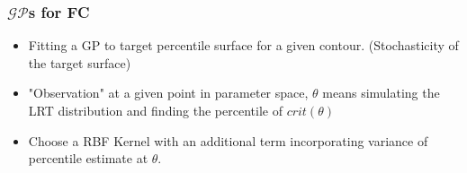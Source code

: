 \documentclass[9pt, aspectratio=169]{beamer}
\begin{document}
\begin{frame}
  \frametitle{$\mathcal{GP}$s for FC}
  \begin{itemize}
    \item Fitting a GP to target percentile surface for a given contour. (Stochasticity of the target surface) 
    \item "Observation" at a given point in parameter space, $\theta$ means simulating the LRT distribution and finding the percentile of $crit(\theta)$
    \item Choose a RBF Kernel with an additional term incorporating variance of percentile estimate at $\theta$. 
      \bigskip
  \end{itemize}
\end{frame}
\end{document}
